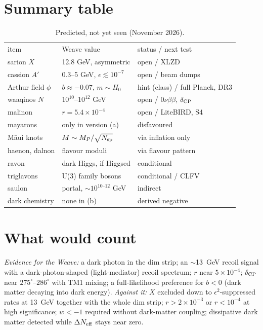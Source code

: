 \documentclass[aps,prd,twocolumn,superscriptaddress,nofootinbib,showkeys]{revtex4-2}
\begin{document}
\section{Summary table}
\begin{table}[h]\caption{Predicted, not yet seen (November 2026).}
\begin{ruledtabular}\begin{tabular}{lll}
item & Weave value & status / next test\\
sarion $X$ & 12.8 GeV, asymmetric & open / XLZD\\
cassion $A'$ & 0.3--5 GeV, $\epsilon\lesssim10^{-7}$ & open / beam dumps\\
Arthur field $\phi$ & $b\approx-0.07$, $m\sim H_0$ & hint (class) / full Planck, DR3\\
waaqinos $N$ & $10^{10}$--$10^{12}$ GeV & open / $0\nu\beta\beta$, $\delta_{\rm CP}$\\
malinon & $r=5.4\times10^{-4}$ & open / LiteBIRD, S4\\
mayarons & only in version (a) & disfavoured\\
Māui knots & $M\sim M_P/\sqrt{N_{\rm sp}}$ & via inflation only\\
haenon, dalnon & flavour moduli & via flavour pattern\\
ravon & dark Higgs, if Higgsed & conditional\\
triglavons & U(3) family bosons & conditional / CLFV\\
saulon & portal, $\sim10^{10\text{--}12}$ GeV & indirect\\
dark chemistry & none in (b) & derived negative\\
\end{tabular}\end{ruledtabular}\end{table}

\section{What would count}
\emph{Evidence for the Weave:} a dark photon in the dim strip; an $\sim$13~GeV recoil signal with a dark-photon-shaped (light-mediator) recoil spectrum; $r$ near $5\times10^{-4}$; $\delta_{\rm CP}$ near $275^\circ$--$286^\circ$ with TM1 mixing; a full-likelihood preference for $b<0$ (dark matter decaying into dark energy).
\emph{Against it:} $X$ excluded down to $\epsilon^2$-suppressed rates at 13~GeV together with the whole dim strip; $r>2\times10^{-3}$ or $r<10^{-4}$ at high significance; $w<-1$ required without dark-matter coupling; dissipative dark matter detected while $\Delta N_{\rm eff}$ stays near zero.
\end{document}

